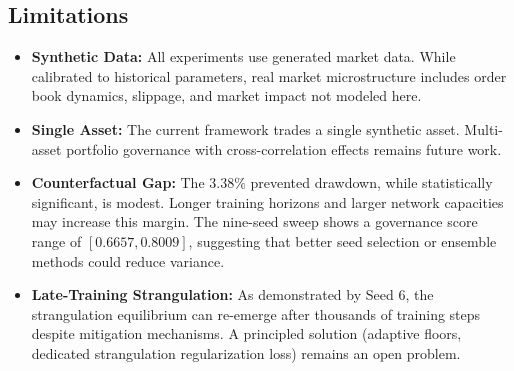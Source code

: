 \documentclass[11pt]{article}
\begin{document}
\subsection{Limitations}
\begin{itemize}[leftmargin=*]
    \item \textbf{Synthetic Data:} All experiments use generated market data. While calibrated to historical parameters, real market microstructure includes order book dynamics, slippage, and market impact not modeled here.
    \item \textbf{Single Asset:} The current framework trades a single synthetic asset. Multi-asset portfolio governance with cross-correlation effects remains future work.
    \item \textbf{Counterfactual Gap:} The $3.38\%$ prevented drawdown, while statistically significant, is modest. Longer training horizons and larger network capacities may increase this margin. The nine-seed sweep shows a governance score range of $[0.6657, 0.8009]$, suggesting that better seed selection or ensemble methods could reduce variance.
    \item \textbf{Late-Training Strangulation:} As demonstrated by Seed 6, the strangulation equilibrium can re-emerge after thousands of training steps despite mitigation mechanisms. A principled solution (adaptive floors, dedicated strangulation regularization loss) remains an open problem.
\end{itemize}

\end{document}
